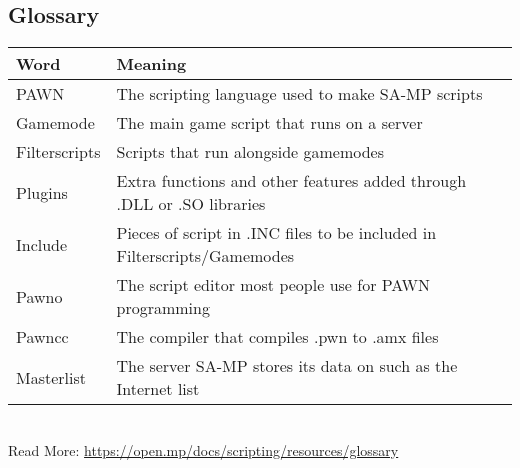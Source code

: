 \documentclass{article}
\begin{document}
\subsection{Glossary}
\begin{tabular}{ |l|l| } 
\hline
Word & Meaning \\
\hline
PAWN & The scripting language used to make SA-MP scripts \\
Gamemode & The main game script that runs on a server \\
Filterscripts & Scripts that run alongside gamemodes \\
Plugins & Extra functions and other features added through .DLL or .SO libraries \\
Include & Pieces of script in .INC files to be included in Filterscripts/Gamemodes \\
Pawno & The script editor most people use for PAWN programming \\
Pawncc & The compiler that compiles .pwn to .amx files \\
Masterlist & The server SA-MP stores its data on such as the Internet list \\
\hline
\end{tabular}
\bigskip
\\Read More: \url{https://open.mp/docs/scripting/resources/glossary}
\end{document}
